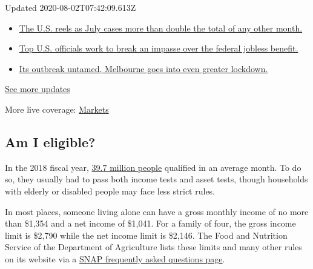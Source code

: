 Updated 2020-08-02T07:42:09.613Z

\begin{itemize}
\tightlist
\item
  \href{https://www.nytimes3xbfgragh.onion/2020/08/01/world/coronavirus-covid-19.html?action=click\&pgtype=Article\&state=default\&region=MAIN_CONTENT_1\&context=storylines_live_updates\#link-34047410}{The
  U.S. reels as July cases more than double the total of any other
  month.}
\item
  \href{https://www.nytimes3xbfgragh.onion/2020/08/01/world/coronavirus-covid-19.html?action=click\&pgtype=Article\&state=default\&region=MAIN_CONTENT_1\&context=storylines_live_updates\#link-780ec966}{Top
  U.S. officials work to break an impasse over the federal jobless
  benefit.}
\item
  \href{https://www.nytimes3xbfgragh.onion/2020/08/01/world/coronavirus-covid-19.html?action=click\&pgtype=Article\&state=default\&region=MAIN_CONTENT_1\&context=storylines_live_updates\#link-2bc8948}{Its
  outbreak untamed, Melbourne goes into even greater lockdown.}
\end{itemize}

\href{https://www.nytimes3xbfgragh.onion/2020/08/01/world/coronavirus-covid-19.html?action=click\&pgtype=Article\&state=default\&region=MAIN_CONTENT_1\&context=storylines_live_updates}{See
more updates}

More live coverage:
\href{https://www.nytimes3xbfgragh.onion/live/2020/07/31/business/stock-market-today-coronavirus?action=click\&pgtype=Article\&state=default\&region=MAIN_CONTENT_1\&context=storylines_live_updates}{Markets}

\hypertarget{am-i-eligible}{%
\subsection{Am I eligible?}\label{am-i-eligible}}

In the 2018 fiscal year,
\href{https://fns-prod.azureedge.net/sites/default/files/resource-files/Characteristics2018-Summary.pdf}{39.7
million people} qualified in an average month. To do so, they usually
had to pass both income tests and asset tests, though households with
elderly or disabled people may face less strict rules.

In most places, someone living alone can have a gross monthly income of
no more than \$1,354 and a net income of \$1,041. For a family of four,
the gross income limit is \$2,790 while the net income limit is \$2,146.
The Food and Nutrition Service of the Department of Agriculture lists
these limits and many other rules on its website via a
\href{https://www.fns.usda.gov/snap/recipient/eligibility}{SNAP
frequently asked questions page}.


